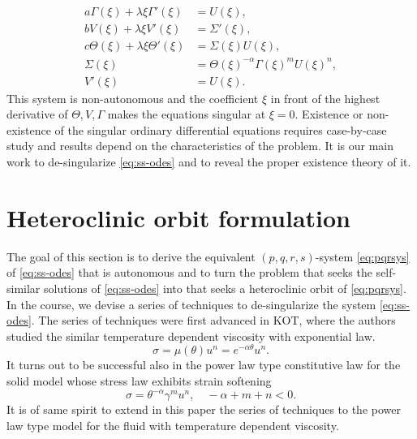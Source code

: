 \documentclass[a4paper,11pt]{article}
\begin{document}
\begin{equation}
\begin{aligned}
 a \Gamma(\xi) + \lambda \xi \Gamma'(\xi) &= U(\xi),\\
 b V(\xi) + \lambda \xi V'(\xi) &= \Sigma'(\xi),\\
 c \Theta(\xi) + \lambda \xi \Theta'(\xi)&=\Sigma(\xi) U(\xi),\\
 \Sigma(\xi) &= \Theta(\xi)^{-\alpha} \Gamma(\xi)^m U(\xi)^n,\\
 V'(\xi)&=U(\xi).
\end{aligned} \label{eq:ss-odes}
\end{equation}
This system is non-autonomous and the coefficient $\xi$ in front of the highest derivative of $\Theta, V, \Gamma$ makes the equations singular at $\xi=0$. Existence or non-existence of the singular ordinary differential equations requires case-by-case study and results depend on the characteristics of the problem. It is our main work to de-singularize \eqref{eq:ss-odes} and to reveal the proper existence theory of it. 

\section{Heteroclinic orbit formulation}
The goal of this section is to derive the equivalent $(p,q,r,s)$-system \eqref{eq:pqrsys} of \eqref{eq:ss-odes} that is autonomous and to turn the problem that seeks the self-similar solutions of \eqref{eq:ss-odes} into that seeks a heteroclinic orbit of \eqref{eq:pqrsys}. In the course, we devise a series of techniques to de-singularize the system \eqref{eq:ss-odes}. The series of techniques were first advanced in KOT, where the authors studied the similar temperature dependent viscosity with exponential law. 
$$ \sigma = \mu(\theta)u^n = e^{-\alpha\theta} u^n.$$ 
It turns out to be successful also in the power law type constitutive law for the solid model whose stress law exhibits strain softening
$$ \sigma = \theta^{-\alpha}\gamma^{m}u^n, \quad -\alpha+m+n<0.$$
It is of same spirit to extend in this paper the series of techniques to the power law type model for the fluid with temperature dependent viscosity.
\end{document}
